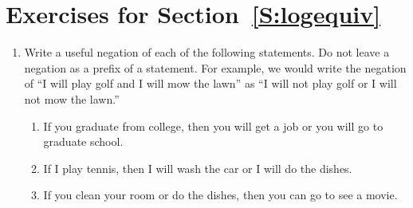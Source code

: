 \section*{Exercises for Section~\ref{S:logequiv}}
\begin{enumerate}
%
\xitem Write the converse and contrapositive of each of the following conditional statements. \label{exer:sec23-1}%
  \begin{enumerate}
    \item If  $a = 5$, then  $a^2  = 25$.  %
    \item If it is not raining, then Laura is playing golf.
    \item If  $a \ne b$, then  $a^4  \ne b^4 $. %
    \item If  $a$  is an odd integer, then  $3a$ is an odd integer. %
  \end{enumerate} 
%
\xitem Write each of the conditional statements in Exercise~(\ref{exer:sec23-1}) as a logically equivalent disjunction, and write the negation of each of the conditional statements in Exercise~(\ref{exer:sec23-1}) as a conjunction.\label{exer:sec23-2}
%
\item Write a useful negation of each of the following statements.  Do not leave a negation as a prefix of a statement.  For example, we would write the negation of ``I will play golf and I will mow the lawn'' as ``I will not play golf or I will not mow the lawn.'' \label{exer:sec23-3}

\begin{enumerate}
\yitem We will win the first game and we will win the second game.

\yitem They will lose the first game or they will lose the second game.

\yitem If you mow the lawn, then I will pay you \$20.

\yitem If we do not win the first game, then we will not play a second game.

\yitem I will wash the car or I will mow the lawn.

\item If you graduate from college, then you will get a job or you will go to graduate school.

\item If I play tennis, then I will wash the car or I will do the dishes.

\item If you clean your room or do the dishes, then you can go to see a movie.


\end{enumerate}
\end{enumerate}
